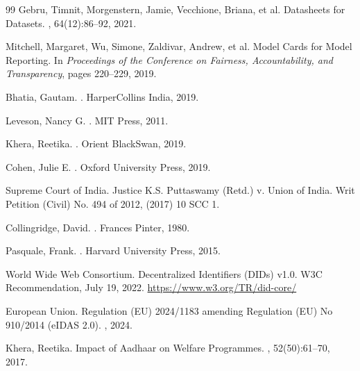 \documentclass{article}
\begin{document}
\begin{thebibliography}{99}
Gebru, Timnit, Morgenstern, Jamie, Vecchione, Briana, et al.
\newblock Datasheets for Datasets.
, 64(12):86--92, 2021.

Mitchell, Margaret, Wu, Simone, Zaldivar, Andrew, et al.
\newblock Model Cards for Model Reporting.
\newblock In {\em Proceedings of the Conference on Fairness, Accountability, and Transparency}, pages 220--229, 2019.

Bhatia, Gautam.
.
\newblock HarperCollins India, 2019.

Leveson, Nancy G.
.
\newblock MIT Press, 2011.

Khera, Reetika.
.
\newblock Orient BlackSwan, 2019.

Cohen, Julie E.
.
\newblock Oxford University Press, 2019.

Supreme Court of India.
\newblock Justice K.S. Puttaswamy (Retd.) v. Union of India.
\newblock Writ Petition (Civil) No. 494 of 2012, (2017) 10 SCC 1.

Collingridge, David.
.
\newblock Frances Pinter, 1980.

Pasquale, Frank.
.
\newblock Harvard University Press, 2015.

World Wide Web Consortium.
\newblock Decentralized Identifiers (DIDs) v1.0.
\newblock W3C Recommendation, July 19, 2022.
\newblock \url{https://www.w3.org/TR/did-core/}

European Union.
\newblock Regulation (EU) 2024/1183 amending Regulation (EU) No 910/2014 (eIDAS 2.0).
, 2024.

Khera, Reetika.
\newblock Impact of Aadhaar on Welfare Programmes.
, 52(50):61--70, 2017.


\end{thebibliography}
\end{document}
